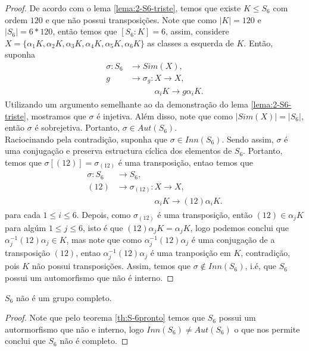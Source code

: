 \begin{proof} 
  De acordo com o lema \ref{lema:2-S6-triste}, temos que existe $K\leq S_6$ com ordem $120$ e que não possui transposições. Note que como $|K|=120$ e $|S_6|=6\ast 120$, então temos que $[S_6:K]=6$, assim, considere $X=\{\alpha_1K,\alpha_2K,\alpha_3K,\alpha_4K,\alpha_5K,\alpha_6K\}$ as classes a esquerda de $K$. Então, suponha
  \begin{align*}
    \sigma:S_6&\to Sim(X),\\
             g&\to \sigma_g:X\to X,\\
   \phantom{g}&\phantom{\to \sigma_g:}\alpha_iK\to g\alpha_iK.
  \end{align*}
  Utilizando um argumento semelhante ao da demonstração do lema \ref{lema:2-S6-triste}, mostramos que $\sigma$ é injetiva. Além disso, note que como $|Sim(X)|=|S_6|$, então $\sigma$ é sobrejetiva. Portanto, $\sigma\in Aut(S_6)$.\\
  
  Raciocinando pela contradição, suponha que $\sigma\in Inn(S_6)$. Sendo assim, $\sigma$ é uma conjugação e preserva estructura cíclica dos elementos de $S_6$. Portanto, temos que $\sigma[(12)]=\sigma_{(12)}$ é uma transposição, entao temos que
  \begin{align*}
    \sigma:S_6&\to S_6,\\
             (12)&\to \sigma_{(12)}:X\to X,\\
      \phantom{g}&\phantom{\to \sigma_(12):}\alpha_iK\to (12)\alpha_iK.
  \end{align*}
  para cada $1\leq i\leq 6$. Depois, como $\sigma_{(12)}$ é uma transposição, então $(12)\in \alpha_jK$ para algúm $1\leq j\leq 6$, isto é que $(12)\alpha_jK=\alpha_jK$, logo podemos conclui que $\alpha_j^{-1}(12)\alpha_j\in K$, mas note que como $\alpha_j^{-1}(12)\alpha_j$ é uma conjugação de a transposição $(12)$, entao $\alpha_j^{-1}(12)\alpha_j$ é uma tranposição em $K$, contradição, pois $K$ não possui transposições. Assim, temos que $\sigma\notin Inn(S_6)$, i.é, que $S_6$ possui um automorfismo que não é interno.
\end{proof}
\begin{corollary}
  $S_6$ não é um grupo completo. 
\end{corollary}
\begin{proof} 
  Note que pelo teorema \ref{th:S-6pronto} temos que $S_6$ possui um autormorfismo que não e interno, logo $Inn(S_6)\neq Aut(S_6)$ o que nos permite conclui que $S_6$ não é completo. 
\end{proof}
